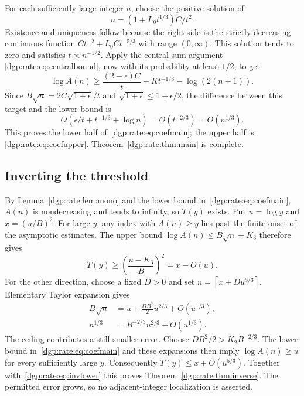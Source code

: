 \documentclass[11pt,letterpaper]{article}
\numberwithin{equation}{section}
\theoremstyle{remark}\newtheorem{remark}[theorem]{Remark}
\newcommand{\ceil}[1]{\left\lceil #1\right\rceil}
\begin{document}
For each sufficiently large integer $n$, choose the positive solution of
\begin{equation}\label{dgp:rate:eq:tchoice}
 n=(1+L_0t^{1/3})C/t^2.
\end{equation}
Existence and uniqueness follow because the right side is the strictly
decreasing continuous function $Ct^{-2}+L_0Ct^{-5/3}$ with range
$(0,\infty)$. This solution tends to zero and satisfies
$t\asymp n^{-1/2}$. Apply the central-sum argument
\eqref{dgp:rate:eq:centralbound}, now with its probability at least $1/2$, to get
\begin{equation}\label{dgp:rate:eq:coeflowerinter}
 \log A(n)\geq\frac{(2-\epsilon)C}{t}
          -Kt^{-1/3}-\log(2(n+1)).
\end{equation}
Since $B\sqrt n=2C\sqrt{1+\epsilon}/t$ and
$\sqrt{1+\epsilon}\leq1+\epsilon/2$, the difference between this target
and the lower bound is
\[
 O(\epsilon/t+t^{-1/3}+\log n)
 =O(t^{-2/3})=O(n^{1/3}).
\]
This proves the lower half of~\eqref{dgp:rate:eq:coefmain}; the upper half is
\eqref{dgp:rate:eq:coefupper}. Theorem~\ref{dgp:rate:thm:main} is complete.

\subsection{Inverting the threshold}
By Lemma~\ref{dgp:rate:lem:mono} and the lower bound in~\eqref{dgp:rate:eq:coefmain},
$A(n)$ is nondecreasing and tends to infinity, so $T(y)$ exists. Put
$u=\log y$ and $x=(u/B)^2$. For large $y$, any index with $A(n)\geq y$
lies past the finite onset of the asymptotic estimates. The upper bound
$\log A(n)\leq B\sqrt n+K_3$ therefore gives
\begin{equation}\label{dgp:rate:eq:invlower}
 T(y)\geq\left(\frac{u-K_3}{B}\right)^2=x-O(u).
\end{equation}
For the other direction, choose a fixed $D>0$ and set
$n=\ceil{x+D u^{5/3}}$. Elementary Taylor expansion gives
\begin{align}
 B\sqrt n&=u+\frac{DB^2}{2}u^{2/3}+O(u^{1/3}),\label{dgp:rate:eq:invtaylor1}\\
 n^{1/3}&=B^{-2/3}u^{2/3}+O(u^{1/3}).\label{dgp:rate:eq:invtaylor2}
\end{align}
The ceiling contributes a still smaller error. Choose
$DB^2/2>K_2B^{-2/3}$. The lower bound in~\eqref{dgp:rate:eq:coefmain} and these
expansions then imply $\log A(n)\geq u$ for every sufficiently large $y$.
Consequently $T(y)\leq x+O(u^{5/3})$. Together with~\eqref{dgp:rate:eq:invlower}
this proves Theorem~\ref{dgp:rate:thm:inverse}. The permitted error grows, so no
adjacent-integer localization is asserted.
\end{document}
